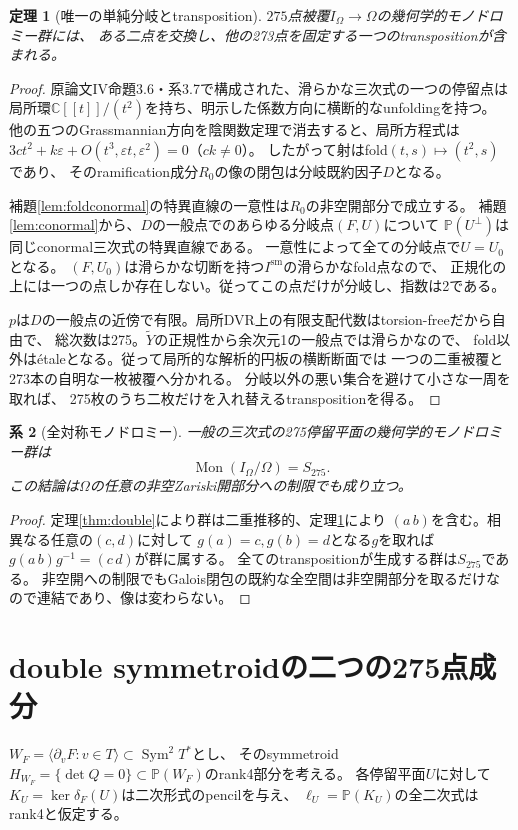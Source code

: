 \documentclass[11pt,a4paper]{ltjsarticle}
\newtheorem{theorem}{定理}[section]
\newtheorem{corollary}[theorem]{系}
\newcommand{\C}{\mathbb C}
\newcommand{\PP}{\mathbb P}
\newcommand{\Sym}{\operatorname{Sym}}
\newcommand{\Mon}{\operatorname{Mon}}
\begin{document}
\begin{theorem}[唯一の単純分岐とtransposition]\label{thm:transposition}
$275$点被覆$I_\Omega\to\Omega$の幾何学的モノドロミー群には、
ある二点を交換し、他の273点を固定する一つのtranspositionが含まれる。
\end{theorem}
\begin{proof}
原論文IV命題3.6・系3.7で構成された、滑らかな三次式の一つの停留点は
局所環$\C[[t]]/(t^2)$を持ち、明示した係数方向に横断的なunfoldingを持つ。
他の五つのGrassmannian方向を陰関数定理で消去すると、局所方程式は
$3ct^2+k\varepsilon+O(t^3,\varepsilon t,\varepsilon^2)=0$（$ck\ne0$）。
したがって射はfold$(t,s)\mapsto(t^2,s)$であり、
そのramification成分$R_0$の像の閉包は分岐既約因子$D$となる。

補題\ref{lem:foldconormal}の特異直線の一意性は$R_0$の非空開部分で成立する。
補題\ref{lem:conormal}から、$D$の一般点でのあらゆる分岐点$(F,U)$について
$\PP(U^\perp)$は同じconormal三次式の特異直線である。
一意性によって全ての分岐点で$U=U_0$となる。
$(F,U_0)$は滑らかな切断を持つ$I^{\mathrm{sm}}$の滑らかなfold点なので、
正規化の上には一つの点しか存在しない。従ってこの点だけが分岐し、指数は2である。

$p$は$D$の一般点の近傍で有限。局所DVR上の有限支配代数はtorsion-freeだから自由で、
総次数は275。$\widetilde Y$の正規性から余次元1の一般点では滑らかなので、
fold以外はétaleとなる。従って局所的な解析的円板の横断断面では
一つの二重被覆と273本の自明な一枚被覆へ分かれる。
分岐以外の悪い集合を避けて小さな一周を取れば、
275枚のうち二枚だけを入れ替えるtranspositionを得る。
\end{proof}

\begin{corollary}[全対称モノドロミー]\label{cor:full}
一般の三次式の275停留平面の幾何学的モノドロミー群は
\[
 \boxed{\Mon(I_\Omega/\Omega)=S_{275}}.
\]
この結論は$\Omega$の任意の非空Zariski開部分への制限でも成り立つ。
\end{corollary}
\begin{proof}
定理\ref{thm:double}により群は二重推移的、定理\ref{thm:transposition}により
$(a\,b)$を含む。相異なる任意の$(c,d)$に対して
$g(a)=c,g(b)=d$となる$g$を取れば
$g(a\,b)g^{-1}=(c\,d)$が群に属する。
全てのtranspositionが生成する群は$S_{275}$である。
非空開への制限でもGalois閉包の既約な全空間は非空開部分を取るだけなので連結であり、像は変わらない。
\end{proof}

\section{double symmetroidの二つの275点成分}
$W_F=\langle\partial_vF:v\in T\rangle\subset\Sym^2T^*$とし、
そのsymmetroid$H_{W_F}=\{\det Q=0\}\subset\PP(W_F)$のrank4部分を考える。
各停留平面$U$に対して$K_U=\ker\delta_F(U)$は二次形式のpencilを与え、
$\ell_U=\PP(K_U)$の全二次式はrank4と仮定する。
\end{document}
